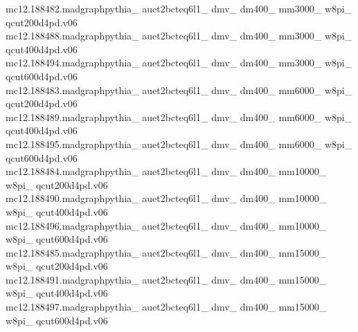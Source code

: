 mc12.188482.madgraphpythia\_ auet2bcteq6l1\_ dmv\_ dm400\_ mm3000\_ w8pi\_ qcut200d4pd.v06\\
mc12.188488.madgraphpythia\_ auet2bcteq6l1\_ dmv\_ dm400\_ mm3000\_ w8pi\_ qcut400d4pd.v06\\
mc12.188494.madgraphpythia\_ auet2bcteq6l1\_ dmv\_ dm400\_ mm3000\_ w8pi\_ qcut600d4pd.v06\\

mc12.188483.madgraphpythia\_ auet2bcteq6l1\_ dmv\_ dm400\_ mm6000\_ w8pi\_ qcut200d4pd.v06\\
mc12.188489.madgraphpythia\_ auet2bcteq6l1\_ dmv\_ dm400\_ mm6000\_ w8pi\_ qcut400d4pd.v06\\
mc12.188495.madgraphpythia\_ auet2bcteq6l1\_ dmv\_ dm400\_ mm6000\_ w8pi\_ qcut600d4pd.v06\\

mc12.188484.madgraphpythia\_ auet2bcteq6l1\_ dmv\_ dm400\_ mm10000\_ w8pi\_ qcut200d4pd.v06\\

mc12.188490.madgraphpythia\_ auet2bcteq6l1\_ dmv\_ dm400\_ mm10000\_ w8pi\_ qcut400d4pd.v06\\

mc12.188496.madgraphpythia\_ auet2bcteq6l1\_ dmv\_ dm400\_ mm10000\_ w8pi\_ qcut600d4pd.v06\\

mc12.188485.madgraphpythia\_ auet2bcteq6l1\_ dmv\_ dm400\_ mm15000\_ w8pi\_ qcut200d4pd.v06\\

mc12.188491.madgraphpythia\_ auet2bcteq6l1\_ dmv\_ dm400\_ mm15000\_ w8pi\_ qcut400d4pd.v06\\

mc12.188497.madgraphpythia\_ auet2bcteq6l1\_ dmv\_ dm400\_ mm15000\_ w8pi\_ qcut600d4pd.v06\\